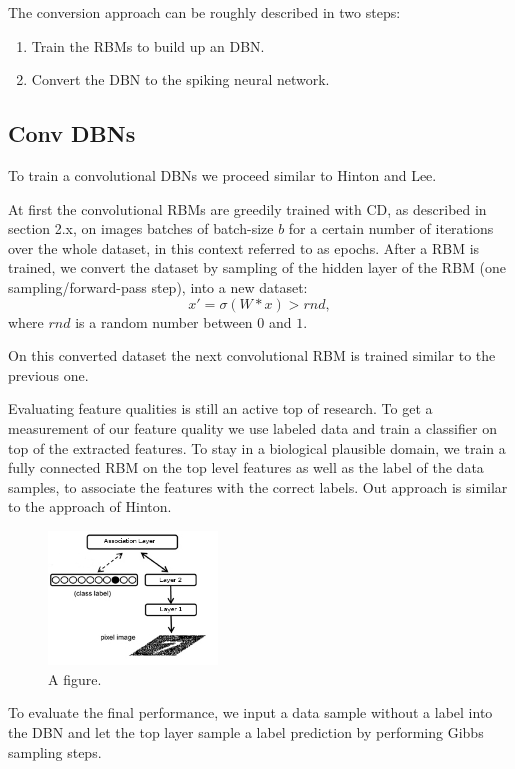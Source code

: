 The conversion approach can be roughly described in two steps:
\begin{enumerate}
\item Train the RBMs to build up an DBN.
\item Convert the DBN to the spiking neural network.
\end{enumerate}


\subsection{Conv DBNs}

To train a convolutional DBNs we proceed similar to Hinton and Lee.

At first the convolutional RBMs are greedily trained with CD, as described in section 2.x, on images batches of batch-size $b$ for a certain number of iterations over the whole dataset, in this context referred to as epochs.
After a RBM is trained, we convert the dataset by sampling of the hidden layer of the RBM (one sampling/forward-pass step), into a new dataset:
\[
x' = \sigma(W * x) > rnd,
\]
where $rnd$ is a random number between $0$ and $1$.

On this converted dataset the next convolutional RBM is trained similar to the previous one.

Evaluating feature qualities is still an active top of research.
To get a measurement of our feature quality we use labeled data and train a classifier on top of the extracted features.
To stay in a biological plausible domain, we train a fully connected RBM on the top level features as well as the label of the data samples, to associate the features with the correct labels.
Out approach is similar to the approach of Hinton.

\begin{figure}
	\centering
    	\includegraphics[width=0.4\textwidth]{imgs/dbn_mnist.png} 
    \caption{A figure.}
	\label{fig:test}
\end{figure}

To evaluate the final performance, we input a data sample without a label into the DBN and let the top layer sample a label prediction by performing Gibbs sampling steps.


